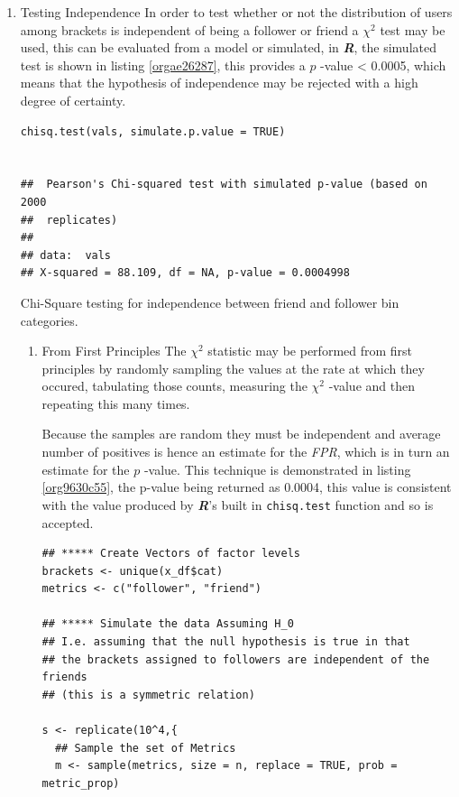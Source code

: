 \documentclass[11pt]{article}
\begin{document}
\begin{enumerate}
\item Testing Independence
\label{sec:org56bfa76}
In order to test whether or not the distribution of users among brackets is
independent of being a follower or friend a \(\chi^{2}\) test may be used, this
can be evaluated from a model or simulated, in \textbf{\emph{R}}, the simulated test is
shown in listing \ref{orgae26287}, this provides a \(p\) -value < 0.0005, which means that the hypothesis of independence may be rejected with a high degree of certainty.

\begin{listing}[htbp]
\begin{verbatim}
chisq.test(vals, simulate.p.value = TRUE)


## 	Pearson's Chi-squared test with simulated p-value (based on 2000
## 	replicates)
##
## data:  vals
## X-squared = 88.109, df = NA, p-value = 0.0004998
\end{verbatim}
\caption{\label{orgae26287}Chi-Square testing for independence between friend and follower bin categories.}
\end{listing}

\begin{enumerate}
\item From First Principles
\label{sec:orgf497726}
The \(\chi^{2}\) statistic may be performed from first principles by randomly
sampling the values at the rate at which they occured, tabulating those counts, measuring the \(\chi^{2}\) -value and then repeating this many times.

Because the samples are random they must be independent and average number of
positives is hence an estimate for the \emph{FPR}, which is in turn an estimate for
the \(p\) -value. This technique is demonstrated in listing \ref{org9630c55}, the p-value
being returned as 0.0004, this value is consistent with the value produced by
\textbf{\emph{R}}'s built in \texttt{chisq.test} function and so is accepted.

\begin{listing}[htbp]
\begin{verbatim}
## ***** Create Vectors of factor levels
brackets <- unique(x_df$cat)
metrics <- c("follower", "friend")

## ***** Simulate the data Assuming H_0
## I.e. assuming that the null hypothesis is true in that
## the brackets assigned to followers are independent of the friends
## (this is a symmetric relation)

s <- replicate(10^4,{
  ## Sample the set of Metrics
  m <- sample(metrics, size = n, replace = TRUE, prob = metric_prop)


\end{verbatim}
\end{listing}
\end{enumerate}
\end{enumerate}
\end{document}
